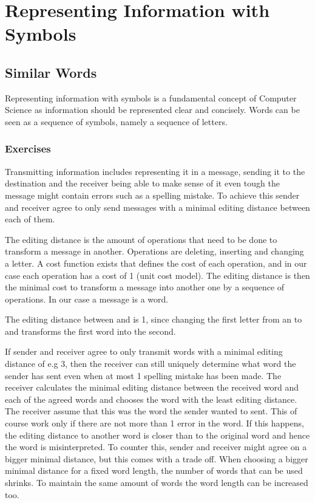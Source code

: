 \chapter{Representing Information with Symbols}
\label{chapter:representingInformationWithWymbols}

\section{Similar Words}
\label{section:similarWords}

Representing information with symbols is a fundamental concept of Computer Science as information should be represented clear and concisely. Words can be seen as a sequence of symbols, namely a sequence of letters.

\subsection{Exercises}

Transmitting information includes representing it in a message, sending it to the destination and the receiver being able to make sense of it even tough the message might contain errors such as a spelling mistake. To achieve this sender and receiver agree to only send messages with a minimal editing distance \cite{AnD} between each of them. 

The editing distance is the amount of operations that need to be done to transform a message in another. Operations are deleting, inserting and changing a letter. 
A cost function exists that defines the cost of each operation, and in our case each operation has a cost of 1 (unit cost model). The editing distance is then the minimal cost to transform a message into another one by a sequence of operations. In our case a message is a word.

\begin{example}
    The editing distance between  and  is 1, since changing the first letter from an  to and  transforms the first word into the second.
\end{example}

If sender and receiver agree to only transmit words with a minimal editing distance of e.g 3, then the receiver can still uniquely determine what word the sender has sent even when at most 1 spelling mistake has been made. The receiver calculates the minimal editing distance between the received word and each of the agreed words and chooses the word with the least editing distance.
The receiver assume that this was the word the sender wanted to sent. This of course work only if there are not more than 1 error in the word. If this happens, the editing distance to another word is closer than to the original word and hence the word is misinterpreted. To counter this, sender and receiver might agree on a bigger minimal distance, but this comes with a trade off. When choosing a bigger minimal distance for a fixed word length, the number of words that can be used shrinks. To maintain the same amount of words the word length can be increased too.

